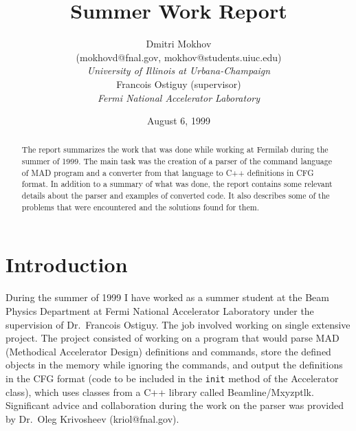 \documentclass[12pt]{article}
\begin{document}
\title{\textbf{Summer Work Report}}
\author{Dmitri Mokhov \\
        \small{(mokhovd@fnal.gov, mokhov@students.uiuc.edu)} \\
        \vspace{3mm}
        \textit{University of Illinois at Urbana-Champaign} \\
        Francois Ostiguy (supervisor) \\
        \textit{Fermi National Accelerator Laboratory} }
\date{August 6, 1999}

\maketitle

\begin{abstract}
The report summarizes the work that was done while working at Fermilab
during the summer of 1999. The main task was the creation of a parser of
the command language of MAD program and a converter from that language to
C++ definitions in CFG format. In addition to a summary of what was done,
the report contains some relevant details about the parser and examples of
converted code. It also describes some of the problems that were encountered
and the solutions found for them.
\end{abstract}

\section{Introduction}
During the summer of 1999 I have worked as a summer student at the Beam
Physics Department at Fermi National Accelerator Laboratory under the
supervision of Dr.~Francois Ostiguy. The job involved working on single
extensive project. The project consisted of working on a program that
would parse MAD (Methodical Accelerator Design) definitions and commands,
store the defined objects in the memory while ignoring the commands, and
output the definitions in the CFG format (code to be included in the
\texttt{init} method of the Accelerator class), which uses classes from a C++
library called Beamline/Mxyzptlk. Significant advice and collaboration
during the work on the parser was provided by Dr.~Oleg Krivosheev
(kriol@fnal.gov).
\end{document}
